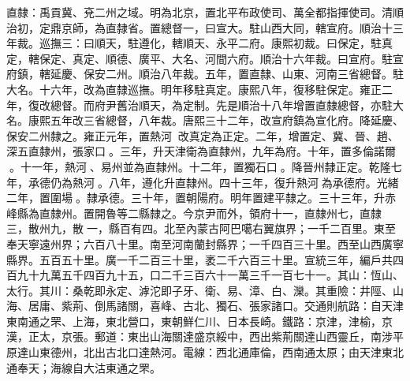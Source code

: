 \begin{pinyinscope}
直隸：禹貢冀、兗二州之域。明為北京，置北平布政使司、萬全都指揮使司。清順治初，定鼎京師，為直隸省。置總督一，曰宣大。駐山西大同，轄宣府。順治十三年裁。巡撫三：曰順天，駐遵化，轄順天、永平二府。康熙初裁。曰保定，駐真定，轄保定、真定、順德、廣平、大名、河間六府。順治十六年裁。曰宣府。駐宣府鎮，轄延慶、保安二州。順治八年裁。五年，置直隸、山東、河南三省總督。駐大名。十六年，改為直隸巡撫。明年移駐真定。康熙八年，復移駐保定。雍正二年，復改總督。而府尹舊治順天，為定制。先是順治十八年增置直隸總督，亦駐大名。康熙五年改三省總督，八年裁。唐熙三十二年，改宣府鎮為宣化府。降延慶、保安二州隸之。雍正元年，置熱河，改真定為正定。二年，增置定、冀、晉、趙、深五直隸州，張家口。三年，升天津衛為直隸州，九年為府。十年，置多倫諾爾。十一年，熱河、易州並為直隸州。十二年，置獨石口。降晉州隸正定。乾隆七年，承德仍為熱河。八年，遵化升直隸州。四十三年，復升熱河為承德府。光緒二年，置圍場。隸承德。三十年，置朝陽府。明年置建平隸之。三十三年，升赤峰縣為直隸州。置開魯等二縣隸之。今京尹而外，領府十一，直隸州七，直隸三，散州九，散一，縣百有四。北至內蒙古阿巴噶右翼旗界；一千二百里。東至奉天寧遠州界；六百八十里。南至河南蘭封縣界；一千四百三十里。西至山西廣寧縣界。五百五十里。廣一千二百三十里，袤二千六百三十里。宣統三年，編戶共四百九十九萬五千四百九十五，口二千三百六十一萬三千一百七十一。其山：恆山、太行。其川：桑乾即永定、滹沱即子牙、衛、易、漳、白、灤。其重險：井陘、山海、居庸、紫荊、倒馬諸關，喜峰、古北、獨石、張家諸口。交通則航路：自天津東南通之罘、上海，東北營口，東朝鮮仁川、日本長崎。鐵路：京津，津榆，京漢，正太，京張。郵道：東出山海關達盛京綏中，西出紫荊關達山西靈丘，南涉平原達山東德州，北出古北口達熱河。電線：西北通庫倫，西南通太原；由天津東北通奉天；海線自大沽東通之罘。


\end{pinyinscope}
